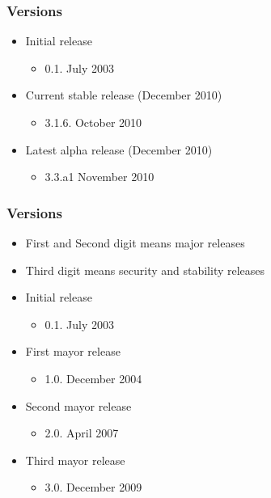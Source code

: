 \documentclass{beamer}
\begin{document}

\begin{frame}
 \frametitle{Versions}
 \begin{itemize}
 \item Initial release
    \begin{itemize}
     \item 0.1. July 2003
    \end{itemize}

 \item Current stable release (December 2010)
    \begin{itemize}
     \item 3.1.6. October 2010
    \end{itemize}

 \item Latest alpha release (December 2010)
    \begin{itemize}
     \item 3.3.a1 November 2010
    \end{itemize}

 \end{itemize}
\end{frame}


\begin{frame}
 \frametitle{Versions}
 \begin{itemize}
 \item First and Second digit means major releases
 \item Third digit means security and stability releases
 \item Initial release
    \begin{itemize}
     \item 0.1. July 2003
    \end{itemize}

 \item First mayor release
    \begin{itemize}
     \item 1.0. December 2004
    \end{itemize}

 \item Second mayor release
    \begin{itemize}
     \item 2.0. April 2007
    \end{itemize}

 \item Third mayor release
    \begin{itemize}
     \item 3.0. December 2009
    \end{itemize}

 \end{itemize}
\end{frame}
\end{document}
